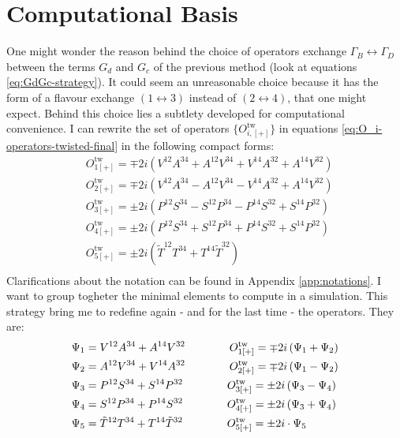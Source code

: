 \documentclass[english, LaM, oneside, noexaminfo]{sapthesis}
\begin{document}
\section{Computational Basis}
\noindent
One might wonder the reason behind the choice of operators exchange $\Gamma_B \leftrightarrow \Gamma_D$ between the terms $G_d$ and $G_c$ of the previous method (look at equations \ref{eq:GdGc-strategy}).
It could seem an unreasonable choice because it has the form of a flavour exchange $(1\leftrightarrow 3)$ instead of $(2\leftrightarrow 4)$, that one might expect.
Behind this choice lies a subtlety developed for computational convenience.
\newline
I can rewrite the set of operators $\{O_{i,[+]}^\text{tw}\}$ in equations \ref{eq:O_i-operators-twisted-final} in the following compact forms:
\begin{equation}
    \begin{split}
        & O_{1[+]}^\text{tw} = \mp 2i \left( V^{12}A^{34} + A^{12}V^{34} + V^{14}A^{32} + A^{14}V^{32} \right) \\
        & O_{2[+]}^\text{tw} = \mp 2i \left( V^{12}A^{34} - A^{12}V^{34} - V^{14}A^{32} + A^{14}V^{32} \right) \\
        & O_{3[+]}^\text{tw} = \pm 2i \left( P^{12}S^{34} - S^{12}P^{34} - P^{14}S^{32} + S^{14}P^{32} \right) \\
        & O_{4[+]}^\text{tw} = \pm 2i \left( P^{12}S^{34} + S^{12}P^{34} + P^{14}S^{32} + S^{14}P^{32} \right) \\
        & O_{5[+]}^\text{tw} = \pm 2i \left( \tilde{T}^{12}T^{34} + T^{14}\tilde{T}^{32} \right) \\
    \end{split}
\end{equation}
Clarifications about the notation can be found in Appendix \ref{app:notations}.
I want to group togheter the minimal elements to compute in a simulation.
This strategy bring me to redefine again - and for the last time - the operators.
They are:
\begin{equation*}
    \begin{split}
        & \Psi_{1} =  V^{12}A^{34} + A^{14}V^{32} \hspace*{40pt} O_{1[+]}^\text{tw} = \mp 2i \left( \Psi_{1} + \Psi_{2} \right) \\
        & \Psi_{2} =  A^{12}V^{34} + V^{14}A^{32} \hspace*{40pt} O_{2[+]}^\text{tw} = \mp 2i \left( \Psi_{1} - \Psi_{2} \right) \\
        & \Psi_{3} =  P^{12}S^{34} + S^{14}P^{32} \hspace*{40pt} O_{3[+]}^\text{tw} = \pm 2i \left( \Psi_{3} - \Psi_{4} \right) \\
        & \Psi_{4} =  S^{12}P^{34} + P^{14}S^{32} \hspace*{40pt} O_{4[+]}^\text{tw} = \pm 2i \left( \Psi_{3} + \Psi_{4} \right) \\
        & \Psi_{5} =  \tilde{T}^{12}T^{34} + T^{14}\tilde{T}^{32} \hspace*{40pt} O_{5[+]}^\text{tw} = \pm 2i \cdot \Psi_{5} \\
    \end{split}
\end{equation*}
\end{document}
